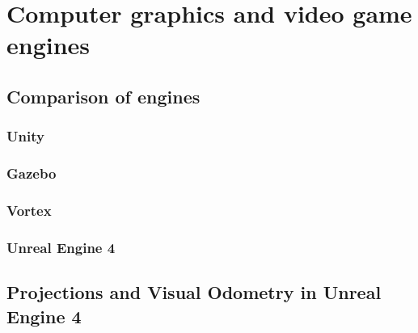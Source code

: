 
\chapter{Computer graphics and video game engines}

\section{Comparison of engines}

\subsection{Unity}

\subsection{Gazebo}

\subsection{Vortex}

\subsection{Unreal Engine 4}

\section{Projections and Visual Odometry in Unreal Engine 4}

\cleardoublepage